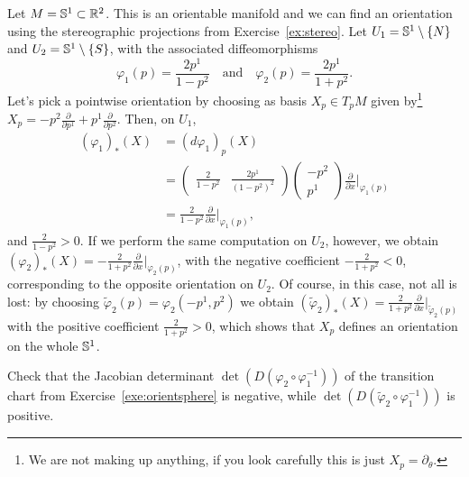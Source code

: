 \begin{example}\label{exe:orientsphere}
  Let $M = \mathbb{S}^1\subset \mathbb{R}^2$.
  This is an orientable manifold and we can find an orientation using the stereographic projections from Exercise~\ref{ex:stereo}.
  Let $U_1 = \mathbb{S}^1\setminus\{N\}$ and $U_2 = \mathbb{S}^1\setminus\{S\}$, with the associated diffeomorphisms
  \begin{equation}
    \varphi_1(p) = \frac{2p^1}{1-p^2}
    \quad\mbox{and}\quad
    \varphi_2(p) = \frac{2p^1}{1+p^2}.
  \end{equation}
  Let's pick a pointwise orientation by choosing as basis $X_p\in T_pM$ given by\footnote{We are not making up anything, if you look carefully this is just $X_p = \partial_\theta$.} $X_p = -p^2 \frac{\partial}{\partial p^1} + p^1 \frac{\partial}{\partial p^2}$.
  Then, on $U_1$,
  \begin{align}
    (\varphi_1)_*(X) &= (d\varphi_1)_p(X) \\
    &= \left(\begin{smallmatrix}
      \frac{2}{1-p^2} & \frac{2p^1}{(1-p^2)^2}
    \end{smallmatrix}\right)
    \left(\begin{smallmatrix}
      -p^2 \\ p^1
    \end{smallmatrix}\right) \frac{\partial}{\partial x}\Big|_{\varphi_1(p)}\\
    &= \frac{2}{1-p^2} \frac{\partial}{\partial x}\Big|_{\varphi_1(p)}, 
  \end{align}
  and $\frac{2}{1-p^2}>0$.
  If we perform the same computation on $U_2$, however, we obtain $(\varphi_2)_*(X) = -\frac{2}{1+p^2}\frac{\partial}{\partial x}\Big|_{\varphi_2(p)}$, with the negative coefficient $-\frac{2}{1+p^2} < 0$, corresponding to the opposite orientation on $U_2$.
  Of course, in this case, not all is lost: by choosing $\widetilde\varphi_2(p) = \varphi_2(-p^1, p^2)$ we obtain $(\widetilde\varphi_2)_*(X) = \frac{2}{1+p^2} \frac{\partial}{\partial x}\Big|_{\widetilde\varphi_2(p)}$ with the positive coefficient $\frac{2}{1+p^2} > 0$, which shows that $X_p$ defines an orientation on the whole $\mathbb{S}^1$.
\end{example}

\begin{exercise}
  Check that the Jacobian determinant $\det(D(\varphi_2\circ \varphi_1^{-1}))$ of the transition chart from Exercise~\ref{exe:orientsphere} is negative, while $\det(D(\widetilde\varphi_2\circ \varphi_1^{-1}))$ is positive.
\end{exercise}


